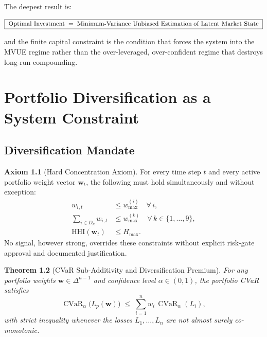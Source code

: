 \documentclass[12pt,openany]{book}
\DeclareMathOperator{\CVaR}{CVaR}
\numberwithin{equation}{chapter}
\theoremstyle{plain}
\newtheorem{theorem}{Theorem}[chapter]
\theoremstyle{definition}
\newtheorem{axiom}[theorem]{Axiom}
\theoremstyle{remark}
\def\mathcal#1{#1}%
\begin{document}
\noindent
The deepest result is:

\begin{equation}
  \boxed{%
    \;\text{Optimal Investment}
    \;=\;
    \text{Minimum-Variance Unbiased Estimation}
    \;\text{of Latent Market State}\;
  }
  \label{eq:mvue-box}
\end{equation}

\noindent
and the finite capital constraint is the condition that forces the
system into the MVUE regime rather than the over-leveraged,
over-confident regime that destroys long-run compounding.

\chapter{Portfolio Diversification as a System Constraint}
\label{ch:diversification}

\section{Diversification Mandate}

\begin{axiom}[Hard Concentration Axiom]
\label{ax:concentration}
For every time step $t$ and every active portfolio weight vector
$\mathbf{w}_t$, the following must hold simultaneously and
without exception:
\begin{align}
  w_{i,t} &\leq w_{\max}^{(i)}
    \quad \forall\, i, \label{eq:hc-asset} \\
  \sum_{i \in \mathcal{D}_k} w_{i,t} &\leq w_{\max}^{(k)}
    \quad \forall\, k \in \{1,\ldots,9\}, \label{eq:hc-bucket} \\
  \mathrm{HHI}(\mathbf{w}_t) &\leq H_{\max}. \label{eq:hc-hhi}
\end{align}
No signal, however strong, overrides these constraints without
explicit risk-gate approval and documented justification.
\end{axiom}

\begin{theorem}[CVaR Sub-Additivity and Diversification Premium]
\label{thm:cvar}
For any portfolio weights $\mathbf{w} \in \Delta^{n-1}$ and
confidence level $\alpha \in (0,1)$, the portfolio CVaR
satisfies
\begin{equation}
  \CVaR_\alpha\!\bigl(L_p(\mathbf{w})\bigr)
  \;\leq\;
  \sum_{i=1}^{n} w_i\,\CVaR_\alpha(L_i),
  \label{eq:cvar-subadd}
\end{equation}
with strict inequality whenever the losses $L_1, \ldots, L_n$
are not almost surely co-monotonic.
\end{theorem}
\end{document}
